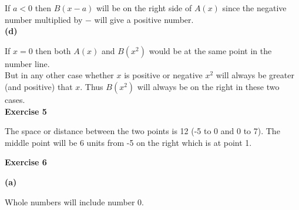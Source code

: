 \documentclass[10pt]{article}
\begin{document}
If $a < 0$ then $B(x - a)$ will be on the right side of $A(x)$ since the negative number multiplied by $-$ will give a positive number. \\

\textbf{(d)}

If $x = 0$ then both $A(x)$ and $B(x^2)$ would be at the same point in the number line.\\

But in any other case whether $x$ is positive or negative $x^2$ will always be greater (and positive) that $x$. Thus 
$B(x^2)$ will always be on the right in these two cases.\\


\textbf{Exercise 5}

The space or distance between the two points is 12 (-5 to 0 and 0 to 7). The middle point will be 6 units from -5 on the right which is at point 1.\\

\begin{center}
\end{center}


\textbf{Exercise 6}

\textbf{(a)}

Whole numbers will include number 0.

\begin{center}
\end{center}
\end{document}
